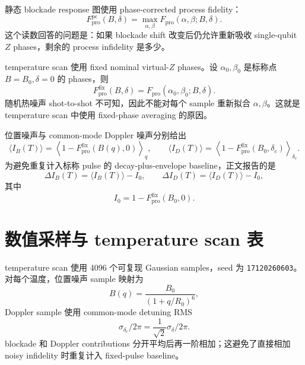 \documentclass[UTF8,11pt]{ctexart}
\numberwithin{equation}{section}
\begin{document}
静态 blockade response 图使用 phase-corrected process fidelity：
\[
F_\mathrm{pro}^\mathrm{pc}(B,\delta)
=\max_{\alpha,\beta}F_\mathrm{pro}(\alpha,\beta;B,\delta).
\]
这个读数回答的问题是：如果 blockade shift 改变后仍允许重新吸收 single-qubit \(Z\) phases，剩余的 process infidelity 是多少。

temperature scan 使用 fixed nominal virtual-\(Z\) phases。设 \(\alpha_0,\beta_0\) 是标称点 \(B=B_0,\delta=0\) 的 phases，则
\[
F_\mathrm{pro}^\mathrm{fix}(B,\delta)
=F_\mathrm{pro}(\alpha_0,\beta_0;B,\delta).
\]
随机热噪声 shot-to-shot 不可知，因此不能对每个 sample 重新拟合 \(\alpha,\beta\)。这就是 temperature scan 中使用 fixed-phase averaging 的原因。

位置噪声与 common-mode Doppler 噪声分别给出
\[
\langle I_B(T)\rangle
=\left\langle 1-F_\mathrm{pro}^\mathrm{fix}(B(q),0)\right\rangle_q,
\qquad
\langle I_D(T)\rangle
=\left\langle 1-F_\mathrm{pro}^\mathrm{fix}(B_0,\delta_c)\right\rangle_{\delta_c}.
\]
为避免重复计入标称 pulse 的 decay-plus-envelope baseline，正文报告的是
\[
\Delta I_B(T)=\langle I_B(T)\rangle-I_0,\qquad
\Delta I_D(T)=\langle I_D(T)\rangle-I_0,
\]
其中
\[
I_0=1-F_\mathrm{pro}^\mathrm{fix}(B_0,0).
\]

\section{数值采样与 temperature scan 表}
\label{app:numerics}

temperature scan 使用 4096 个可复现 Gaussian samples，seed 为 \texttt{17120260603}。对每个温度，位置噪声 sample 映射为
\[
B(q)=\frac{B_0}{(1+q/R_0)^6},
\]
Doppler sample 使用 common-mode detuning RMS
\[
\sigma_{\delta_c}/2\pi=\frac{1}{\sqrt{2}}\sigma_\delta/2\pi.
\]
blockade 和 Doppler contributions 分开平均后再一阶相加；这避免了直接相加 noisy infidelity 时重复计入 fixed-pulse baseline。
\end{document}
